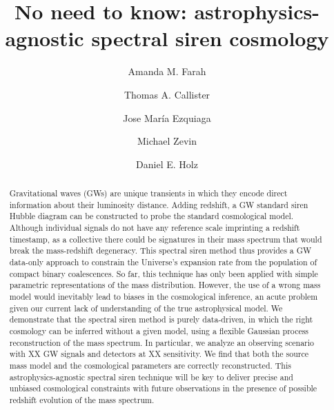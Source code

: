 \documentclass[]{aastex631}
\begin{document}
\title{No need to know: astrophysics-agnostic spectral siren cosmology}

\author{Amanda M. Farah}

\author{Thomas A. Callister}

\author{Jose Mar\'ia Ezquiaga}

\author{Michael Zevin}

\author{Daniel E. Holz}


\begin{abstract}
Gravitational waves (GWs) are unique transients in which they encode direct information about their luminosity distance. 
Adding redshift, a GW standard siren Hubble diagram can be constructed to probe the standard cosmological model.  
Although individual signals do not have any reference scale imprinting a redshift timestamp, as a collective there could be signatures in their mass spectrum that would break the mass-redshift degeneracy. 
This spectral siren method thus provides a GW data-only approach to constrain the Universe's expansion rate from the population of compact binary coalescences. 
So far, this technique has only been applied with simple parametric representations of the mass distribution. 
However, the use of a wrong mass model would inevitably lead to biases in the cosmological inference, an acute problem given our current lack of understanding of the true astrophysical model.
We demonstrate that the spectral siren method is purely data-driven, in which the right cosmology can be inferred without a given model, using a flexible Gaussian process reconstruction of the mass spectrum. 
In particular, we analyze an observing scenario with XX GW signals and detectors at XX sensitivity. 
We find that both the source mass model and the cosmological parameters are correctly reconstructed. 
This astrophysics-agnostic spectral siren technique will be key to deliver precise and unbiased cosmological constraints with future observations in the presence of possible redshift evolution of the mass spectrum.  
\end{abstract}
\end{document}
